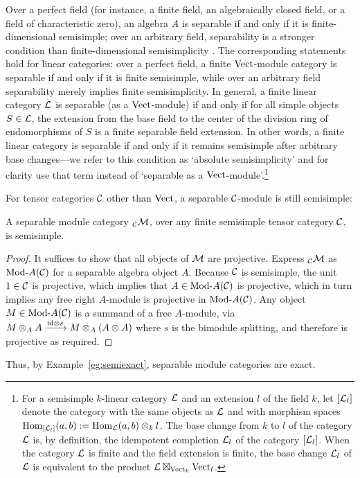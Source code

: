 \documentclass{amsart}
\begin{document}
Over a perfect field (for instance, a finite field, an algebraically closed field, or a field of characteristic zero), an algebra $A$ is separable if and only if it is finite-dimensional semisimple; over an arbitrary field, separability is a stronger condition than finite-dimensional semisimplicity \cite[Ch.~2]{MR0280479}.  The corresponding statements hold for linear categories: over a perfect field, a finite $\mathrm{Vect}$-module category is separable if and only if it is finite semisimple, while over an arbitrary field separability merely implies finite semisimplicity. %
In general, a finite linear category $\mathcal L$ is separable (as a $\mathrm{Vect}$-module) if and only if for all simple objects $S \in \mathcal L$, the extension from the base field to the center of the division ring of endomorphisms of $S$ is a finite separable field extension.  In other words, a finite linear category is separable if and only if it remains semisimple after arbitrary base changes---we refer to this condition as `absolute semisimplicity' and for clarity use that term instead of `separable as a $\mathrm{Vect}$-module'.\footnote{For a semisimple $k$-linear category $\mathcal L$ and an extension $l$ of the field $k$, let $[\mathcal L_l]$ denote the category with the same objects as $\mathcal L$ and with morphism spaces $\operatorname{Hom}_{[\mathcal L_l]}(a,b) := \operatorname{Hom}_{\mathcal L}(a,b) \otimes_k l$.  The base change from $k$ to $l$ of the category $\mathcal L$ is, by definition, the idempotent completion $\mathcal L_l$ of the category $[\mathcal L_l]$.  When the category $\mathcal L$ is finite and the field extension is finite, the base change $\mathcal L_l$ of $\mathcal L$ is equivalent to the product $\mathcal L \boxtimes_{\mathrm{Vect}_k} \mathrm{Vect}_l$.}


For tensor categories $\mathcal C$ other than $\mathrm{Vect}$, a separable $\mathcal C$-module is still semisimple:
\begin{proposition} \label{prop:sepmodissemi}
A separable module category ${}_\mathcal C \mathcal M$, over any finite semisimple tensor category $\mathcal C$, is semisimple.
\end{proposition}
\begin{proof}
It suffices to show that all objects of $\mathcal M$ are projective.  Express ${}_\mathcal C \mathcal M$ as $\Mod{}{A}(\cC)$ for a separable algebra object $A$.  Because $\mathcal C$ is semisimple, the unit $1 \in \mathcal C$ is projective, which implies that $A \in \Mod{}{A}(\cC)$ is projective, which in turn implies any free right $A$-module is projective in $\Mod{}{A}(\cC)$.  Any object $M \in \Mod{}{A}(\cC)$ is a summand of a free $A$-module, via $M \otimes_A A \xrightarrow{\mathrm{id} \otimes s} M \otimes_A (A \otimes A)$ where $s$ is the bimodule splitting, and therefore is projective as required.
\end{proof}
\noindent Thus, by Example~\ref{eg:semiexact}, separable module categories are exact.
\end{document}
